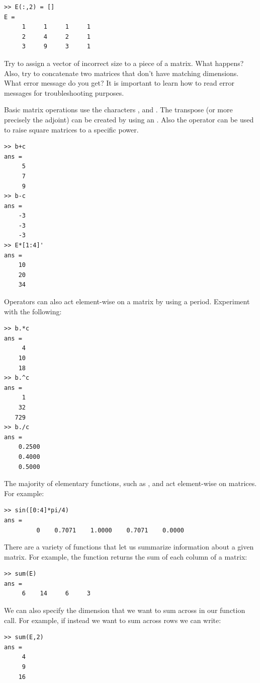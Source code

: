 \begin{lstlisting}[style=matlab]
>> E(:,2) = []
E =
     1     1     1     1
     2     4     2     1
     3     9     3     1
\end{lstlisting}
 
\begin{problem}
Try to assign a vector of incorrect size to a piece of a matrix. What happens? Also, try to concatenate two matrices that don't have matching dimensions. What error message do you get? It is important to learn how to read error messages for troubleshooting purposes.
\end{problem}

Basic matrix operations use the characters \li{+}, \li{-} and \li{*}. The transpose (or more precisely the adjoint) can be created by using an . Also the \li{^} operator can be used to raise square matrices to a specific power.
\begin{lstlisting}[style=matlab]
>> b+c
ans =
     5
     7
     9
>> b-c
ans =
    -3
    -3
    -3
>> E*[1:4]'
ans =
    10
    20
    34
\end{lstlisting}

Operators can also act element-wise on a matrix by using a period. Experiment with the following:

\begin{lstlisting}[style=matlab]
>> b.*c
ans =
     4
    10
    18
>> b.^c
ans =
     1
    32
   729
>> b./c
ans =
    0.2500
    0.4000
    0.5000
\end{lstlisting}

The majority of elementary functions, such as ,  and  act element-wise on matrices. For example:
\begin{lstlisting}[style=matlab]
>> sin([0:4]*pi/4)
ans =
         0    0.7071    1.0000    0.7071    0.0000    
\end{lstlisting}

There are a variety of functions that let us summarize information about a given matrix. For example, the  function returns the sum of each column of a matrix:
\begin{lstlisting}[style=matlab]
>> sum(E)
ans =
     6    14     6     3
\end{lstlisting}

We can also specify the dimension that we want to sum across in our function call. For example, if instead we want to sum across rows we can write:

\begin{lstlisting}[style=matlab]
>> sum(E,2)
ans =
     4
     9
    16
\end{lstlisting}

